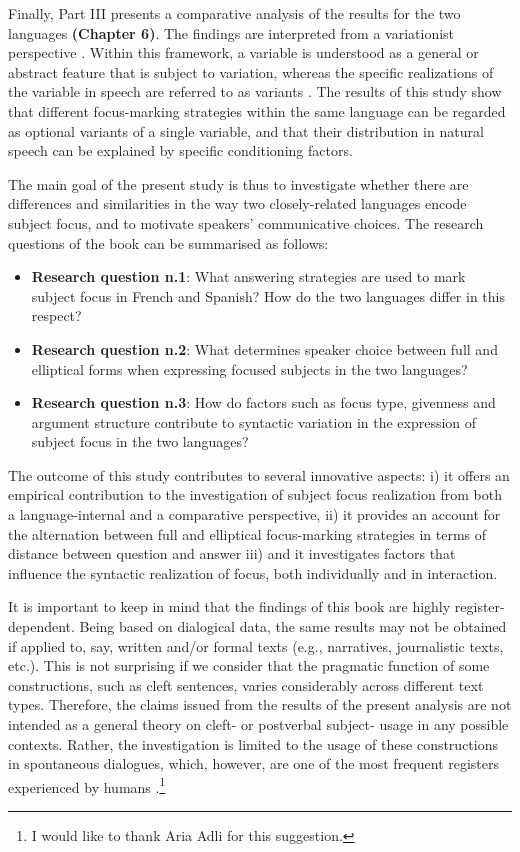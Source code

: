 Finally, Part III presents a comparative analysis of the results for the two languages \textbf{(Chapter 6)}. The findings are interpreted from a variationist perspective \parencite{labov1972sociolinguistic, labov1994principles, labov_2006}. Within this framework, a variable is understood as a general or abstract feature that is subject to variation, whereas the specific realizations of the variable in speech are referred to as variants \parencite{meyerhoff2018introducing}. The results of this study show that different focus-marking strategies within the same language can be regarded as optional variants of a single variable, and that their distribution in natural speech can be explained by specific conditioning factors.

The main goal of the present study is thus to investigate whether there are differences and similarities in the way two closely-related languages encode subject focus, and to motivate speakers' communicative choices. The research questions of the book can be summarised as follows: 

\begin{itemize}
\item \textbf{Research question n.1}: What answering strategies are used to mark subject focus in French and Spanish? How do the two languages differ in this respect?
\item \textbf{Research question n.2}: What determines speaker choice between full and elliptical forms when expressing focused subjects in the two languages?
\item \textbf{Research question n.3}: How do factors such as focus type, givenness and argument structure contribute to syntactic variation in the expression of subject focus in the two languages?
\end{itemize}

The outcome of this study contributes to several innovative aspects: i) it offers an empirical contribution to the investigation of subject focus realization from both a language-internal and a comparative perspective, ii) it provides an account for the alternation between full and elliptical focus-marking strategies in terms of distance between question and answer iii) and it investigates factors that influence the syntactic realization of focus, both individually and in interaction.

It is important to keep in mind that the findings of this book are highly register-dependent. Being based on dialogical data, the same results may not be obtained if applied to, say, written and/or formal texts (e.g., narratives, journalistic texts, etc.). This is not surprising if we consider that the pragmatic function of some constructions, such as cleft sentences, varies considerably across different text types. Therefore, the claims issued from the results of the present analysis are not intended as a general theory on cleft- or postverbal subject- usage in any possible contexts. Rather, the investigation is limited to the usage of these constructions in spontaneous dialogues, which, however, are one of the most frequent registers experienced by humans \parencite[836]{du1987discourse}.\footnote{I would like to thank Aria Adli for this suggestion.}
